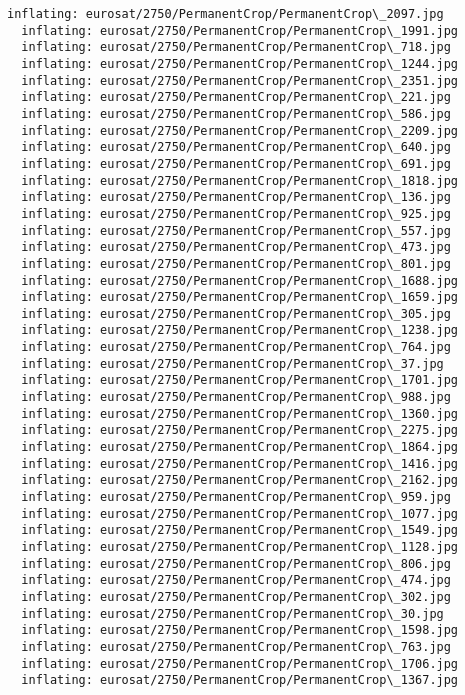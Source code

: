 \documentclass[11pt]{article}
\begin{document}
\begin{Verbatim}[commandchars=\\\{\}]
  inflating: eurosat/2750/PermanentCrop/PermanentCrop\_2097.jpg
  inflating: eurosat/2750/PermanentCrop/PermanentCrop\_1991.jpg
  inflating: eurosat/2750/PermanentCrop/PermanentCrop\_718.jpg
  inflating: eurosat/2750/PermanentCrop/PermanentCrop\_1244.jpg
  inflating: eurosat/2750/PermanentCrop/PermanentCrop\_2351.jpg
  inflating: eurosat/2750/PermanentCrop/PermanentCrop\_221.jpg
  inflating: eurosat/2750/PermanentCrop/PermanentCrop\_586.jpg
  inflating: eurosat/2750/PermanentCrop/PermanentCrop\_2209.jpg
  inflating: eurosat/2750/PermanentCrop/PermanentCrop\_640.jpg
  inflating: eurosat/2750/PermanentCrop/PermanentCrop\_691.jpg
  inflating: eurosat/2750/PermanentCrop/PermanentCrop\_1818.jpg
  inflating: eurosat/2750/PermanentCrop/PermanentCrop\_136.jpg
  inflating: eurosat/2750/PermanentCrop/PermanentCrop\_925.jpg
  inflating: eurosat/2750/PermanentCrop/PermanentCrop\_557.jpg
  inflating: eurosat/2750/PermanentCrop/PermanentCrop\_473.jpg
  inflating: eurosat/2750/PermanentCrop/PermanentCrop\_801.jpg
  inflating: eurosat/2750/PermanentCrop/PermanentCrop\_1688.jpg
  inflating: eurosat/2750/PermanentCrop/PermanentCrop\_1659.jpg
  inflating: eurosat/2750/PermanentCrop/PermanentCrop\_305.jpg
  inflating: eurosat/2750/PermanentCrop/PermanentCrop\_1238.jpg
  inflating: eurosat/2750/PermanentCrop/PermanentCrop\_764.jpg
  inflating: eurosat/2750/PermanentCrop/PermanentCrop\_37.jpg
  inflating: eurosat/2750/PermanentCrop/PermanentCrop\_1701.jpg
  inflating: eurosat/2750/PermanentCrop/PermanentCrop\_988.jpg
  inflating: eurosat/2750/PermanentCrop/PermanentCrop\_1360.jpg
  inflating: eurosat/2750/PermanentCrop/PermanentCrop\_2275.jpg
  inflating: eurosat/2750/PermanentCrop/PermanentCrop\_1864.jpg
  inflating: eurosat/2750/PermanentCrop/PermanentCrop\_1416.jpg
  inflating: eurosat/2750/PermanentCrop/PermanentCrop\_2162.jpg
  inflating: eurosat/2750/PermanentCrop/PermanentCrop\_959.jpg
  inflating: eurosat/2750/PermanentCrop/PermanentCrop\_1077.jpg
  inflating: eurosat/2750/PermanentCrop/PermanentCrop\_1549.jpg
  inflating: eurosat/2750/PermanentCrop/PermanentCrop\_1128.jpg
  inflating: eurosat/2750/PermanentCrop/PermanentCrop\_806.jpg
  inflating: eurosat/2750/PermanentCrop/PermanentCrop\_474.jpg
  inflating: eurosat/2750/PermanentCrop/PermanentCrop\_302.jpg
  inflating: eurosat/2750/PermanentCrop/PermanentCrop\_30.jpg
  inflating: eurosat/2750/PermanentCrop/PermanentCrop\_1598.jpg
  inflating: eurosat/2750/PermanentCrop/PermanentCrop\_763.jpg
  inflating: eurosat/2750/PermanentCrop/PermanentCrop\_1706.jpg
  inflating: eurosat/2750/PermanentCrop/PermanentCrop\_1367.jpg

\end{Verbatim}
\end{document}
